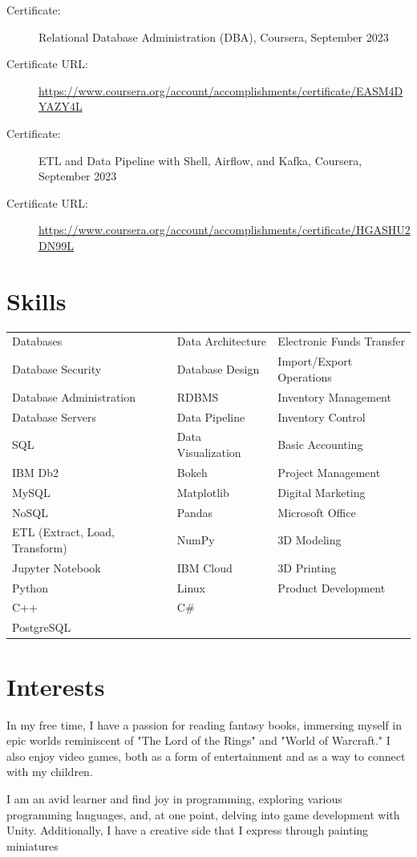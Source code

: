 \documentclass[a4paper,10pt]{article}
\begin{document}
\vspace{1pt} %

\begin{description}
    \item[Certificate:] Relational Database Administration (DBA), Coursera, September 2023
    \item[Certificate URL:] \url{https://www.coursera.org/account/accomplishments/certificate/EASM4DYAZY4L}
\end{description}

\vspace{1pt} %

\begin{description}
    \item[Certificate:] ETL and Data Pipeline with Shell, Airflow, and Kafka, Coursera, September 2023
    \item[Certificate URL:] \url{https://www.coursera.org/account/accomplishments/certificate/HGASHU2DN99L}
\end{description}

\section*{Skills}
\begin{tabular}{p{4.5cm}p{4.5cm}p{4.5cm}}
    Databases & Data Architecture & Electronic Funds Transfer \\
    Database Security & Database Design & Import/Export Operations \\
    Database Administration & RDBMS & Inventory Management \\
    Database Servers & Data Pipeline & Inventory Control \\
    SQL & Data Visualization & Basic Accounting \\
    IBM Db2 & Bokeh & Project Management \\
    MySQL & Matplotlib & Digital Marketing \\
    NoSQL & Pandas & Microsoft Office \\
    ETL (Extract, Load, Transform) & NumPy & 3D Modeling \\
    Jupyter Notebook & IBM Cloud & 3D Printing \\
    Python & Linux & Product Development \\
    C++ & C\# & \\
    PostgreSQL & & \\
\end{tabular}

\section*{Interests}
In my free time, I have a passion for reading fantasy books, immersing myself in epic worlds reminiscent of "The Lord of the Rings" and "World of Warcraft." I also enjoy video games, both as a form of entertainment and as a way to connect with my children.

I am an avid learner and find joy in programming, exploring various programming languages, and, at one point, delving into game development with Unity. Additionally, I have a creative side that I express through painting miniatures
\end{document}

